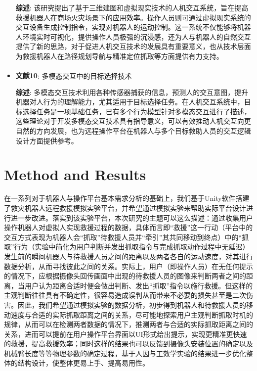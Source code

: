 \documentclass[12pt]{article}  %
\newcommand{\upcite}[1]{\textsuperscript{\textsuperscript{\cite{#1}}}}
\begin{document}
\begin{itemize}[$\blacktriangledown$]
		\textbf{综述}: 该研究提出了基于三维建图和虚拟现实技术的人机交互系统，旨在提高救援机器人在商场火灾场景下的应用效率。操作人员则可通过虚拟现实系统的交互设备生成控制指令，实现对机器人的运动控制。这一系统不仅能够将机器人环境实时可视化，提供操作人员极强的沉浸感，还为人与机器人的自然交互提供了新的思路，对于促进人机交互技术的发展具有重要意义，也从技术层面为救援机器人在路径规划导航与精准定位抓取等方面提供有力支持。
		
		\item \textbf{文献10\upcite{10}}: 多模态交互中的目标选择技术
		
		\textbf{综述}: 多模态交互技术利用各种传感器捕获的信息，预测人的交互意图，提升机器对人行为的理解能力，尤其适用于目标选择任务。在人机交互系统中，目标选择任务是一项基础任务，已有多个行为模型针对多模态交互进行了描述，这些理论对于开发多模态交互技术具有指导意义，可以有效推动人机交互向更自然的方向发展，也为远程操作平台在机器人与多个目标救助人员的交互逻辑设计方面提供参考。
						
	\end{itemize}
	
	\section{Method and Results}
	在一系列对于机器人与操作平台基本需求分析的基础上，我们基于Unity软件搭建了救灾机器人远程救援模拟实验平台，并希望通过模拟实验来帮助实际平台设计进行进一步改进。落实到该实验平台，本次研究的主题可以这么描述：通过收集用户操作机器人对虚拟人实现救援过程的数据，具体而言即“救援”这一行动（平台中的交互方式表现为机器人会“抓取”待救援人员并“牵引”其共同移动到终点）中的“抓取”行为（实验中简化为用户判断并发出抓取指令与完成抓取动作过程中无延迟）发生前的瞬间机器人与待救援人员之间的距离以及两者各自的运动速度，对其进行数据分析，从而寻找彼此之间的关系。实际上，用户（即操作人员）在无任何提示的情况下，应根据摄像头回传画面中出现的待救援人员的图像来判断两者之间的距离，当用户认为距离合适时便会做出判断、发出“抓取”指令以施行救援。但这样的主观判断往往具有不确定性，很容易造成误判从而带来不必要的损失甚至是二次伤害。因此，我们希望通过模拟实验的数据分析，初步得到机器人和待救援人员的移动速度与合适的实际抓取距离之间的关系，尽可能地探索用户主观判断抓取时机的规律，从而可以在检测两者数据的情况下，推测两者与合适的实际抓取距离之间的关系，进而可以提前在用户操作平台界面以UI形式给出提示，实现更精准更快速的救援，提高救援效率；同时这样的结果也可以反馈到摄像头安装位置的确定以及机械臂长度等等物理参数的确定过程，基于人因与工效学实验的结果进一步优化整体的结构设计，使整体更易上手、提高易用性。
	
\end{document}
